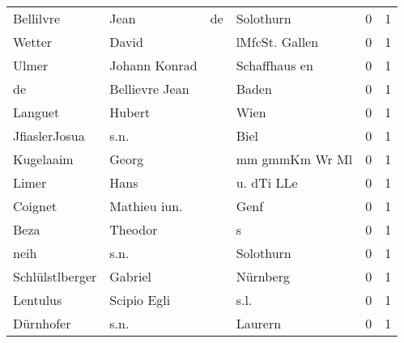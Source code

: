 \begin{tabular}{llllrr}
                Bellilvre &                               Jean &          de &                                   Solothurn &          0 &         1 \\
                   Wetter &                              David &             &                              lMfcSt. Gallen &          0 &         1 \\
                    Ulmer &                      Johann Konrad &             &                               Schaffhaus en &          0 &         1 \\
                       de &                     Bellievre Jean &             &                                       Baden &          0 &         1 \\
                  Languet &                             Hubert &             &                                        Wien &          0 &         1 \\
            JfiaslerJosua &                               s.n. &             &                                        Biel &          0 &         1 \\
                Kugelaaim &                              Georg &             &                              mm gmmKm Wr Ml &          0 &         1 \\
                    Limer &                               Hans &             &                                  u. dTi LLe &          0 &         1 \\
                  Coignet &                       Mathieu iun. &             &                                        Genf &          0 &         1 \\
                     Beza &                            Theodor &             &                                           s &          0 &         1 \\
                     neih &                               s.n. &             &                                   Solothurn &          0 &         1 \\
          Schlülstlberger &                            Gabriel &             &                                    Nürnberg &          0 &         1 \\
                 Lentulus &                        Scipio Egli &             &                                        s.l. &          0 &         1 \\
                Dürnhofer &                               s.n. &             &                                     Laurern &          0 &         1 \\

\end{tabular}

